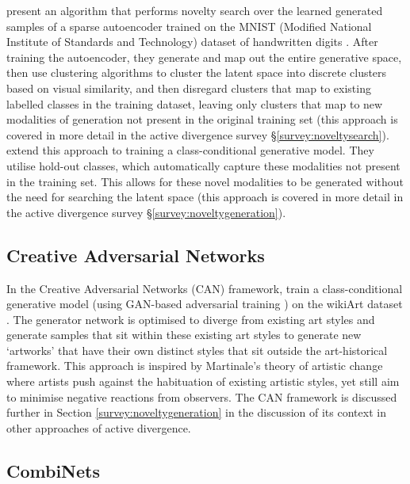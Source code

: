 \citet{kazakcci2016digits} present an algorithm that performs novelty search over the learned generated samples of a sparse autoencoder trained on the MNIST (Modified National Institute of Standards and Technology) dataset of handwritten digits \citep{lecun1998gradient}.
After training the autoencoder, they generate and map out the entire generative space, then use clustering algorithms to cluster the latent space into discrete clusters based on visual similarity, and then disregard clusters that map to existing labelled classes in the training dataset, leaving only clusters that map to new modalities of generation not present in the original training set (this approach is covered in more detail in the active divergence survey \S \ref{survey:noveltysearch}). 
\citep{cherti2017out} extend this approach to training a class-conditional generative model. 
They utilise hold-out classes, which automatically capture these modalities not present in the training set. 
This allows for these novel modalities to be generated without the need for searching the latent space (this approach is covered in more detail in the active divergence survey \S \ref{survey:noveltygeneration}).

\subsection{Creative Adversarial Networks}

In the Creative Adversarial Networks (CAN) framework, \cite{elgammal2017can} train a class-conditional generative model (using GAN-based adversarial training \citep{goodfellow2014generative}) on the wikiArt dataset \citep{saleh2016large}. 
The generator network is optimised to diverge from existing art styles and generate samples that sit within these existing art styles to generate new `artworks' that have their own distinct styles that sit outside the art-historical framework.
This approach is inspired by Martinale's theory of artistic change \citep{martindale1990clockwork} where artists push against the habituation of existing artistic styles, yet still aim to minimise negative reactions from observers. 
The CAN framework is discussed further in Section \ref{survey:noveltygeneration} in the discussion of its context in other approaches of active divergence. 

\subsection{CombiNets}

